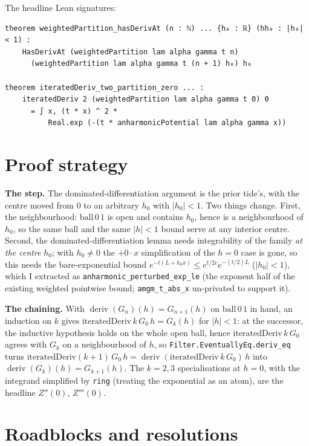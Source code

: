 \documentclass[11pt]{article}
\newcommand{\deriv}{\operatorname{deriv}}
\begin{document}
The headline Lean signatures:

\begin{verbatim}
theorem weightedPartition_hasDerivAt (n : ℕ) ... {h₀ : ℝ} (hh₀ : |h₀| < 1) :
    HasDerivAt (weightedPartition lam alpha gamma t n)
      (weightedPartition lam alpha gamma t (n + 1) h₀) h₀

theorem iteratedDeriv_two_partition_zero ... :
    iteratedDeriv 2 (weightedPartition lam alpha gamma t 0) 0
      = ∫ x, (t * x) ^ 2 *
          Real.exp (-(t * anharmonicPotential lam alpha gamma x))
\end{verbatim}

\section{Proof strategy}

\textbf{The step.} The dominated-differentiation argument is the prior tide's,
with the centre moved from $0$ to an arbitrary $h_0$ with $|h_0|<1$. Two
things change. First, the neighbourhood: $\mathrm{ball}\,0\,1$ is open and
contains $h_0$, hence is a neighbourhood of $h_0$, so the same ball and the
same $|h|<1$ bound serve at any interior centre. Second, the
dominated-differentiation lemma needs integrability of the family
\emph{at the centre} $h_0$; with $h_0\neq0$ the $+0\cdot x$ simplification of
the $h=0$ case is gone, so this needs the bare-exponential bound
$e^{-t(L+h_0x)}\le e^{t/2c}e^{-(t/2)L}$ ($|h_0|<1$), which I extracted as
\texttt{anharmonic\_perturbed\_exp\_le} (the exponent half of the existing
weighted pointwise bound; \texttt{amgm\_t\_abs\_x} un-privated to support it).

\textbf{The chaining.} With $\deriv(G_n)(h)=G_{n+1}(h)$ on $\mathrm{ball}\,0\,1$
in hand, an induction on $k$ gives $\mathrm{iteratedDeriv}\,k\,G_0\,h=G_k(h)$
for $|h|<1$: at the successor, the inductive hypothesis holds on the whole
open ball, hence $\mathrm{iteratedDeriv}\,k\,G_0$ agrees with $G_k$ on a
neighbourhood of $h$, so \texttt{Filter.EventuallyEq.deriv\_eq} turns
$\mathrm{iteratedDeriv}(k{+}1)\,G_0\,h=\deriv(\mathrm{iteratedDeriv}\,k\,G_0)\,h$
into $\deriv(G_k)(h)=G_{k+1}(h)$. The $k=2,3$ specialisations at $h=0$,
with the integrand simplified by \texttt{ring} (treating the exponential as an
atom), are the headline $Z''(0)$, $Z'''(0)$.

\section{Roadblocks and resolutions}
\end{document}
